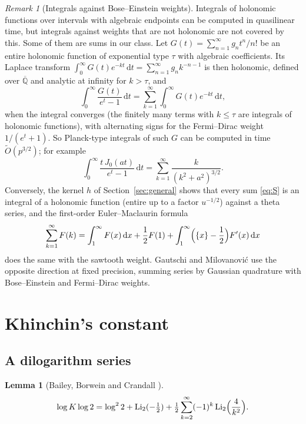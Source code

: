 \documentclass[11pt]{amsart}
\newtheorem{lemma}[theorem]{Lemma}
\theoremstyle{definition}
\theoremstyle{remark}
\newtheorem{remark}[theorem]{Remark}
\newcommand{\Li}{\operatorname{Li}}
\newcommand{\dd}{\,\mathrm{d}}
\newcommand{\Qbar}{\overline{\mathbb{Q}}}
\begin{document}
\begin{remark}[Integrals against Bose--Einstein weights]\label{rem:bose}
Integrals of holonomic functions over intervals with algebraic endpoints can be computed in quasilinear time,
but integrals against weights that are not holonomic are not covered by this. Some of them are sums in our
class. Let $G(t) = \sum_{n=1}^{\infty}g_nt^n/n!$ be an entire holonomic function of exponential type $\tau$ with algebraic
coefficients. Its Laplace transform $\int_0^\infty G(t)e^{-kt}\dd t = \sum_{n=1}^{\infty}g_nk^{-n-1}$ is then holonomic,
defined over $\Qbar$ and analytic at infinity for $k > \tau$, and
\[
  \int_0^\infty \frac{G(t)}{e^t - 1}\dd t = \sum_{k=1}^{\infty}\int_0^\infty G(t)e^{-kt}\dd t,
\]
when the integral converges (the finitely many terms with $k \le \tau$ are integrals of holonomic functions), with
alternating signs for the Fermi--Dirac weight $1/(e^t+1)$. So Planck-type integrals
of such $G$ can be computed in time $\widetilde O(p^{3/2})$; for example
\[
  \int_0^\infty \frac{t\,J_0(at)}{e^t-1}\dd t = \sum_{k=1}^{\infty}\frac{k}{(k^2+a^2)^{3/2}}.
\]
Conversely, the kernel $h$ of Section~\ref{sec:general} shows that every sum \eqref{eq:S} is an integral of a
holonomic function (entire up to a factor $u^{-1/2}$) against a theta series, and the first-order Euler--Maclaurin
formula
\[
  \sum_{k=1}^{\infty}F(k) = \int_1^\infty F(x)\dd x + \frac12F(1) + \int_1^\infty\Bigl(\{x\}-\frac12\Bigr)F'(x)\dd x
\]
does the same with the sawtooth weight. Gautschi and Milovanovi\'c \cite{GM85} use the opposite direction at fixed precision, summing series by Gaussian
quadrature with Bose--Einstein and Fermi--Dirac weights.
\end{remark}

\section{Khinchin's constant}\label{sec:khinchin}

\subsection{A dilogarithm series}

\begin{lemma}[{Bailey, Borwein and Crandall \cite[\S3]{BBC97}}]\label{lem:dilog}
\[
  \log K \log 2 = \log^2 2 + \Li_2(-\tfrac12) + \tfrac12\sum_{k=2}^{\infty}(-1)^k \Li_2\Bigl(\frac{4}{k^2}\Bigr).
\]
\end{lemma}
\end{document}
